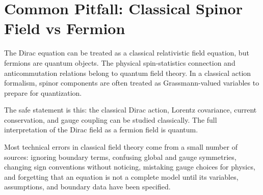 \section{Common Pitfall: Classical Spinor Field vs Fermion}

The Dirac equation can be treated as a classical relativistic field equation, but
fermions are quantum objects. The physical spin-statistics connection and
anticommutation relations belong to quantum field theory. In a classical action
formalism, spinor components are often treated as Grassmann-valued variables to
prepare for quantization.

The safe statement is this: the classical Dirac action, Lorentz covariance,
current conservation, and gauge coupling can be studied classically. The full
interpretation of the Dirac field as a fermion field is quantum.

\begin{summarybox}
Most technical errors in classical field theory come from a small number of
sources: ignoring boundary terms, confusing global and gauge symmetries, changing
sign conventions without noticing, mistaking gauge choices for physics, and
forgetting that an equation is not a complete model until its variables,
assumptions, and boundary data have been specified.
\end{summarybox}
